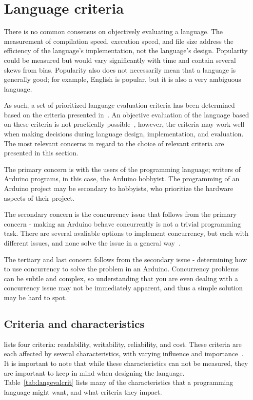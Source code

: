 \section{Language criteria}\label{sec:languageeval}
There is no common consensus on objectively evaluating a language. The measurement of compilation speed, execution speed, and file size address the efficiency of the language's implementation, not the language's design. Popularity could be measured but would vary significantly with time and contain several skews from bias. Popularity also does not necessarily mean that a language is generally good; for example, English is popular, but it is also a very ambiguous language.

As such, a set of prioritized language evaluation criteria has been determined based on the criteria presented in~\cite{Sebesta2016}. An objective evaluation of the language based on these criteria is not practically possible~\cite{Sebesta2016}, however, the criteria may work well when making decisions during language design, implementation, and evaluation. The most relevant concerns in regard to the choice of relevant criteria are presented in this section.

The primary concern is with the users of the programming language; writers of Arduino programs, in this case, the Arduino hobbyist. The programming of an Arduino project may be secondary to hobbyists, who prioritize the hardware aspects of their project.

The secondary concern is the concurrency issue that follows from the primary concern - making an Arduino behave concurrently is not a trivial programming task. There are several avaliable options to implement concurrency, but each with different issues, and none solve the issue in a general way~\cite{Restucia2022}.

The tertiary and last concern follows from the secondary issue - determining how to use concurrency to solve the problem in an Arduino. Concurrency problems can be subtle and complex, so understanding that you are even dealing with a concurrency issue may not be immediately apparent, and thus a simple solution may be hard to spot.

\subsection{Criteria and characteristics}\label{subsec:priorityofcriteria}
 lists four criteria: readability, writability, reliability, and cost. These criteria are each affected by several characteristics, with varying influence and importance~\cite{Sebesta2016}. It is important to note that while these characteristics can not be measured, they are important to keep in mind when designing the language. Table~\ref{tab:langevalcrit} lists many of the characteristics that a programming language might want, and what criteria they impact.


